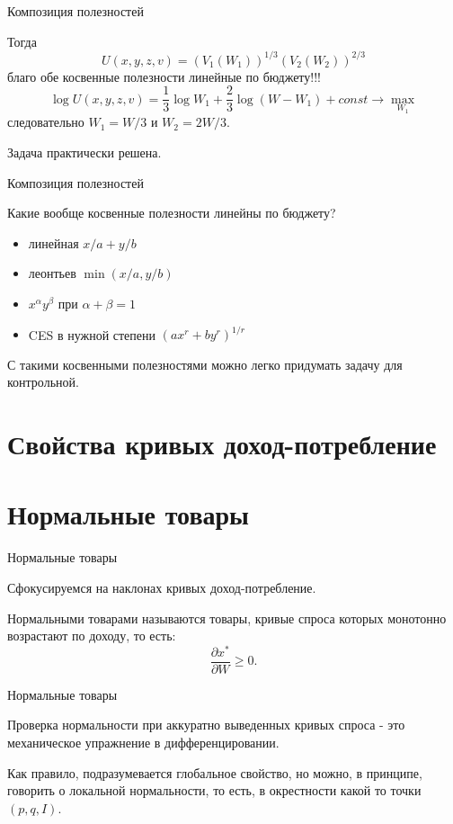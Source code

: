 \documentclass{beamer}
\begin{document}
\begin{frame}{Композиция полезностей}
	
Тогда
$$ U(x,y,z,v) = (V_1(W_1))^{1/3}(V_2(W_2))^{2/3} $$
благо обе косвенные полезности линейные по бюджету!!! 
$$ \log U(x,y,z,v) = \frac{1}{3} \log W_1 + \frac{2}{3} \log (W-W_1) + const \to \max_{W_1}$$
следовательно $W_1 = W/3$ и $W_2 = 2W/3$. 

Задача практически решена.
\end{frame}

\begin{frame}{Композиция полезностей}
	
Какие вообще косвенные полезности линейны по бюджету?

\begin{itemize}
  \item линейная $x/a + y/b$
  \item леонтьев $\min(x/a,y/b)$
  \item $x^\alpha y^\beta$ при $\alpha + \beta = 1$
  \item CES в нужной степени $(a x^r + b y^r)^{1/r}$
\end{itemize}

С такими косвенными полезностями можно легко придумать задачу для контрольной.

\end{frame}

\section{Свойства кривых доход-потребление}
\section{Нормальные товары}

\begin{frame}{Нормальные товары}

Сфокусируемся на наклонах кривых доход-потребление.

\begin{definition}
\alert{Нормальными товарами} называются товары, кривые спроса которых монотонно возрастают по доходу, то есть:
$$\frac{\partial x^{\ast}}{\partial W} \geqslant 0.$$
\end{definition}
\end{frame}

\begin{frame}{Нормальные товары}

Проверка нормальности при аккуратно выведенных кривых спроса - это механическое упражнение в дифференцировании. 

Как правило, подразумевается глобальное свойство, но можно, в принципе, говорить о локальной нормальности, то есть, в окрестности какой то точки $(p,q,I)$.

\end{frame}
\end{document}
